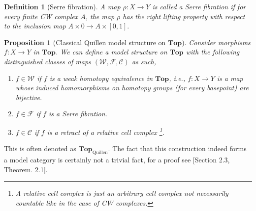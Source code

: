 \documentclass[12pt]{report}
\numberwithin{equation}{section}
\newtheorem{definition}[dummy]{Definition}
\newtheorem{proposition}[dummy]{Proposition}
\begin{document}
%	
	\begin{definition}[Serre fibration]
		A map $\rho: X \to Y$ is called a Serre fibration if for every finite CW complex $A$, the map $\rho$ has the right lifting property with respect to the inclusion map $A \times 0  \to A \times [0,1].$
	\end{definition}
	
	\begin{proposition}[Classical Quillen model structure on $\mathbf{Top}$]
		Consider morphisms $f:X\to Y $ in $\mathbf{Top}$. We can define a model structure on $\mathbf{Top}$ with the following distinguished classes of maps $(\mathcal{W,F,C})$ as such,
		\begin{enumerate}
			\item $f \in \mathcal{W}$ if $f$ is a weak homotopy equivalence in $\mathbf{Top}$, i.e., $f:X \to Y$ is a map whose induced homomorphisms on homotopy groups (for every basepoint) are bijective.
			\item $f \in \mathcal{F}$ if $f$ is a Serre fibration.
			\item $f \in \mathcal{C}$ if $f$ is a retract of a relative cell complex \footnote{A relative cell complex is just an arbitrary cell complex not necessarily countable like in the case of CW complexes.}.
		\end{enumerate}
	\end{proposition}
	This is often denoted as \( \mathbf{Top}_\mathrm{Quillen} \).
	The fact that this construction indeed forms a model category is certainly not a trivial fact, for a proof see \cite{quillen1967homotopical}[Section 2.3, Theorem. 2.1].
	
\end{document}
